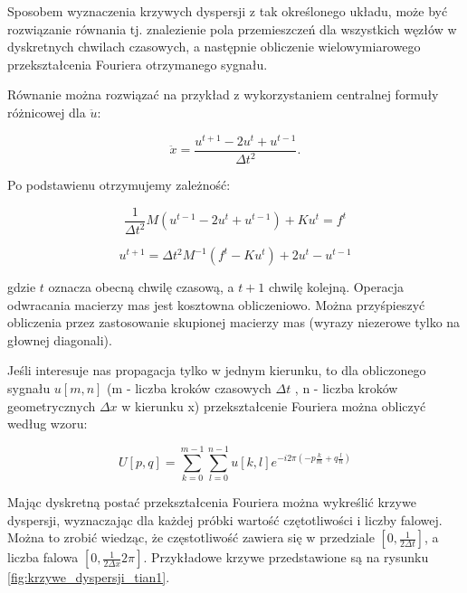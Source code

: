 Sposobem wyznaczenia krzywych dyspersji z tak określonego układu, może być rozwiązanie równania tj. znalezienie pola przemieszczeń dla wszystkich węzłów w dyskretnych chwilach czasowych, a następnie obliczenie wielowymiarowego przekształcenia Fouriera otrzymanego sygnału.

Równanie można rozwiązać na przykład z wykorzystaniem centralnej formuły różnicowej dla \( \ddot u\):

\begin{equation}
\ddot x = \frac{u^{t+1} - 2u^t + u^{t-1}}{\Delta t^2}.
\end{equation}

Po podstawienu otrzymujemy zależność:

\begin{equation}
\frac{1}{\Delta t^2}M(u^{t-1}-2u^t+u^{t-1}) + Ku^t = f^t
\end{equation}

\begin{equation}
u^{t+1}=\Delta t^2 M^{-1}(f^t -Ku^t)+2u^t-u^{t-1}
\end{equation}

gdzie \( t \) oznacza obecną chwilę czasową, a \( t+1 \) chwilę kolejną.
Operacja odwracania macierzy mas jest kosztowna obliczeniowo. Można przyśpieszyć obliczenia przez zastosowanie skupionej macierzy mas (wyrazy niezerowe tylko na głownej diagonali).

Jeśli interesuje nas propagacja tylko w jednym kierunku, to dla obliczonego sygnału \( u[m, n] \) (m - liczba kroków czasowych \(\Delta t \) , n - liczba kroków geometrycznych \(\Delta x\) w kierunku x) przekształcenie Fouriera można obliczyć według wzoru:

\begin{equation}
U[p, q] = \sum_{k=0}^{m-1} \sum_{l=0}^{n-1} u[k, l]e^{-i2\pi (-p \frac{k}{m} + q\frac{l}{n})}
\end{equation}

Mając dyskretną postać przekształcenia Fouriera można wykreślić krzywe dyspersji, wyznaczając dla każdej próbki wartość czętotliwości i liczby falowej. Można to zrobić wiedząc, że częstotliwość zawiera się w przedziale \([0, \frac{1}{2\Delta t}]\), a liczba falowa \([0, \frac{1}{2\Delta x}2\pi]\). Przykładowe krzywe przedstawione są na rysunku \ref{fig:krzywe_dyspersji_tian1}.

\vspace{5mm}


